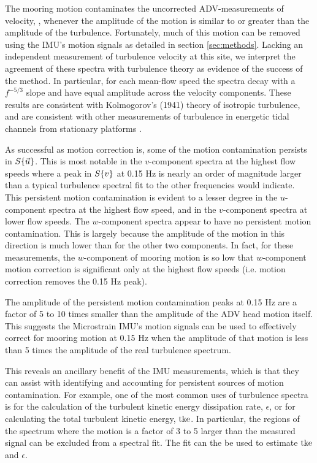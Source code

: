 \documentclass[twocol]{ametsoc}
\begin{document}
The mooring motion contaminates the uncorrected ADV-measurements of velocity, \spec{\umeas}, whenever the amplitude of the motion is similar to or greater than the amplitude of the turbulence. Fortunately, much of this motion can be removed using the IMU's motion signals as detailed in section \ref{sec:methods}. Lacking an independent measurement of turbulence velocity at this site, we interpret the agreement of these spectra with turbulence theory as evidence of the success of the method. In particular, for each mean-flow speed the spectra decay with a $f^{-5/3}$ slope and have equal amplitude across the velocity components. These results are consistent with Kolmogorov's (1941) theory of isotropic turbulence, and are consistent with other measurements of turbulence in energetic tidal channels from stationary platforms \citep[]{Kolmogorov1941c,Walter++2011,Thomson++2012,McMillan++2016}.

As successful as motion correction is, some of the motion contamination persists in $S\{\vec{u}\}$. This is most notable in the $v$-component spectra at the highest flow speeds where a peak in $S\{v\}$ at 0.15 Hz is nearly an order of magnitude larger than a typical turbulence spectral fit to the other frequencies would indicate. This persistent motion contamination is evident to a lesser degree in the $u$-component spectra at the highest flow speed, and in the $v$-component spectra at lower flow speeds.  The $w$-component spectra appear to have no persistent motion contamination. This is largely because the amplitude of the motion in this direction is much lower than for the other two components. In fact, for these measurements, the $w$-component of mooring motion is so low that $w$-component motion correction is significant only at the highest flow speeds (i.e. motion correction removes the 0.15 Hz peak).

The amplitude of the persistent motion contamination peaks at 0.15 Hz are a factor of 5 to 10 times smaller than the amplitude of the ADV head motion itself. This suggests the Microstrain IMU's motion signals can be used to effectively correct for mooring motion at 0.15 Hz when the amplitude of that motion is less than 5 times the amplitude of the real turbulence spectrum.

This reveals an ancillary benefit of the IMU measurements, which is that they can assist with identifying and accounting for persistent sources of motion contamination. For example, one of the most common uses of turbulence spectra is for the calculation of the turbulent kinetic energy dissipation rate, $\epsilon$, or for calculating the total turbulent kinetic energy, $\mathrm{tke}$. In particular, the regions of the spectrum where the motion is a factor of 3 to 5 larger than the measured signal can be excluded from a spectral fit. The fit can the be used to estimate $\mathrm{tke}$ and $\epsilon$. 
\end{document}
